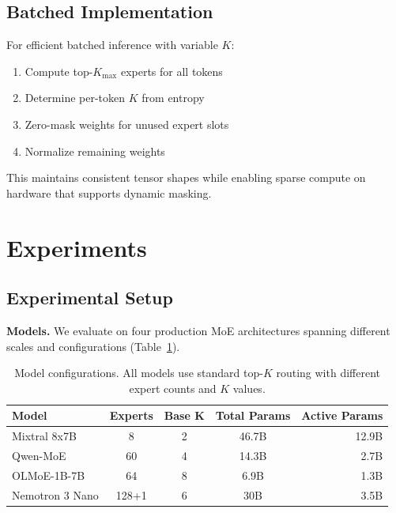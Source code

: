 \documentclass{article}
\begin{document}
\subsection{Batched Implementation}

For efficient batched inference with variable $K$:
\begin{enumerate}
    \item Compute top-$K_{\max}$ experts for all tokens
    \item Determine per-token $K$ from entropy
    \item Zero-mask weights for unused expert slots
    \item Normalize remaining weights
\end{enumerate}

This maintains consistent tensor shapes while enabling sparse compute on hardware that supports dynamic masking.

\section{Experiments}
\label{sec:experiments}

\subsection{Experimental Setup}

\textbf{Models.} We evaluate on four production MoE architectures spanning different scales and configurations (Table~\ref{tab:models}).

\begin{table}[t]
\centering
\caption{Model configurations. All models use standard top-$K$ routing with different expert counts and $K$ values.}
\label{tab:models}
\begin{tabular}{@{}lcccr@{}}
\toprule
\textbf{Model} & \textbf{Experts} & \textbf{Base K} & \textbf{Total Params} & \textbf{Active Params} \\
\midrule
Mixtral 8x7B & 8 & 2 & 46.7B & 12.9B \\
Qwen-MoE & 60 & 4 & 14.3B & 2.7B \\
OLMoE-1B-7B & 64 & 8 & 6.9B & 1.3B \\
Nemotron 3 Nano & 128+1 & 6 & 30B & 3.5B \\
\bottomrule
\end{tabular}
\end{table}
\end{document}
